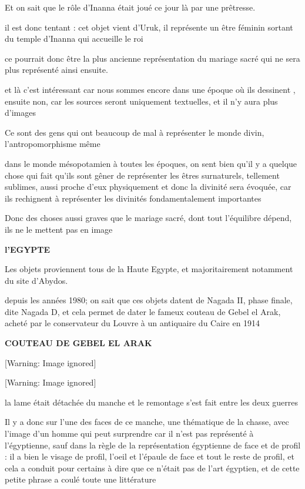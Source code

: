 \documentclass[a4paper,10pt]{article}
\begin{document}
Et on sait que le rôle d'Inanna était joué ce jour là
par une prêtresse.

il est donc tentant : cet objet vient d'Uruk, il
représente un être féminin sortant du temple d'Inanna
qui accueille le roi

ce pourrait donc être la plus ancienne représentation  du mariage sacré
qui ne sera plus représenté ainsi ensuite.

et là c'est intéressant car nous sommes encore dans une
époque où ils dessinent , ensuite non, car les sources seront
uniquement textuelles, et il n'y aura plus
d'images

Ce sont des gens qui ont beaucoup de mal à représenter le monde divin,
l'antropomorphisme même 

dans le monde mésopotamien  à toutes les époques,  on sent bien
qu'il y a quelque chose qui fait
qu'ils sont gêner de représenter les  êtres
surnaturels, tellement sublimes, aussi proche d'eux
physiquement et donc la divinité sera évoquée, car ils rechignent à
représenter les divinités fondamentalement importantes

Donc des choses aussi graves que le mariage sacré, dont tout
l'équilibre dépend, ils ne le mettent pas en image

\textbf{ l'EGYPTE}

Les objets proviennent tous de la Haute Egypte, et majoritairement
notamment du site d'Abydos.

depuis les années 1980; on sait que ces objets datent de Nagada II,
phase finale, dite Nagada D, et cela permet de dater le fameux couteau
de Gebel el Arak, acheté par le conservateur du Louvre à un antiquaire
du Caire en 1914

\textbf{COUTEAU DE GEBEL EL ARAK\ \ }

  [Warning: Image ignored] %
 

  [Warning: Image ignored] %
 

la lame était détachée du manche et le remontage s'est
fait entre les deux guerres

Il y a donc sur l'une des faces de ce manche, une
thématique de la chasse, avec l'image
d'un homme qui peut surprendre car il
n'est pas représenté à l'égyptienne,
sauf dans la règle de la représentation égyptienne de face et de profil
: il a bien le visage de profil, l'oeil et
l'épaule  de face et tout le reste de profil, et cela
a conduit pour certains à dire que ce n'était pas de
l'art égyptien, et de cette petite phrase a coulé
toute une littérature
\end{document}
